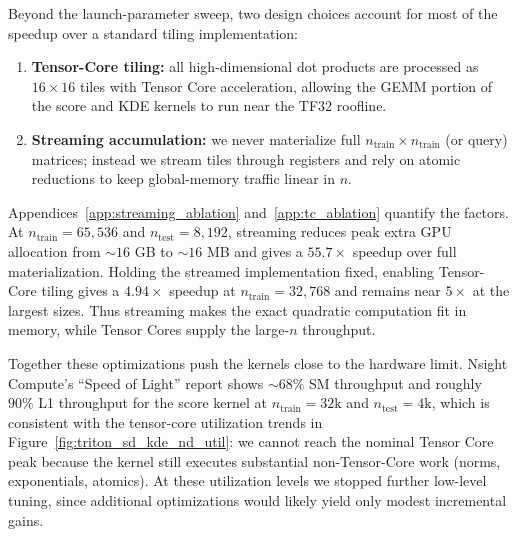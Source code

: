 Beyond the launch-parameter sweep, two design choices account for most of the
speedup over a standard tiling implementation:
\begin{enumerate}
  \item \textbf{Tensor-Core tiling:} all high-dimensional dot products are
        processed as $16 \times 16$ tiles with Tensor Core
        acceleration, allowing the GEMM portion of the score and KDE kernels
        to run near the TF32 roofline.
  \item \textbf{Streaming accumulation:} we never materialize full
        $n_{\text{train}}\times n_{\text{train}}$ (or query) matrices; instead
        we stream tiles through registers and rely on atomic reductions to keep
        global-memory traffic linear in $n$.
\end{enumerate}

Appendices~\ref{app:streaming_ablation} and~\ref{app:tc_ablation} quantify the
factors.  At $n_{\text{train}}=65{,}536$ and
$n_{\text{test}}=8{,}192$, streaming reduces peak extra GPU allocation from
$\sim\!16$ GB to $\sim\!16$ MB and gives a $55.7\times$ speedup over
full materialization.  Holding the streamed implementation fixed, enabling
Tensor-Core tiling gives a $4.94\times$ speedup at
$n_{\text{train}}=32{,}768$ and remains near $5\times$ at the largest
sizes.  Thus streaming makes the exact quadratic computation fit in memory,
while Tensor Cores supply the large-$n$ throughput.

Together these optimizations push the kernels close to the hardware limit.
Nsight Compute's ``Speed of Light'' report shows $\sim 68\%$ SM throughput and
roughly $90\%$ L1 throughput for the score kernel at
$n_{\text{train}}=32\text{k}$ and $n_{\text{test}}=4\text{k}$, which is
consistent with the tensor-core utilization trends in
Figure~\ref{fig:triton_sd_kde_nd_util}: we cannot reach the nominal Tensor
Core peak because the kernel still executes substantial non-Tensor-Core work
(norms, exponentials, atomics).  At these utilization levels we stopped
further low-level tuning, since additional optimizations would likely yield
only modest incremental gains.










